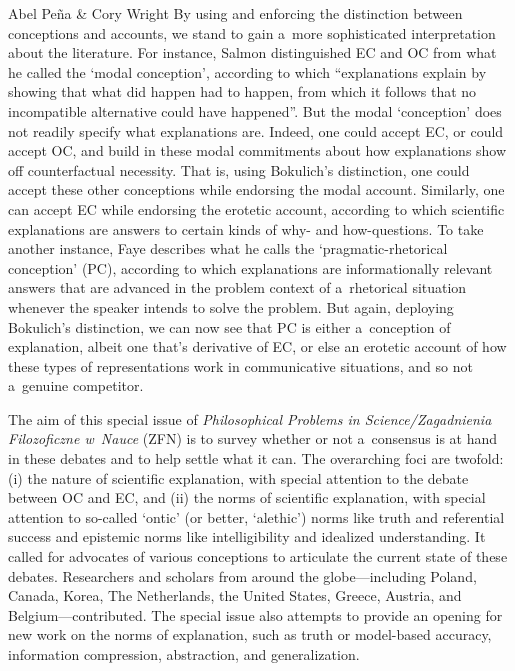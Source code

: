 \begin{editorialeng}{Abel Peña \& Cory Wright}
By using and enforcing the distinction between conceptions and accounts, we stand to gain a~more sophisticated interpretation about the literature. For instance, Salmon
\parencite*[][p.301]{salmon_scientific_1984} %
 distinguished EC and OC from what he called the `modal conception', according to which ``explanations explain by showing that what did happen had to happen, from which it follows that no incompatible alternative could have happened''. But the modal `conception' does not readily specify what explanations are. Indeed, one could accept EC, or could accept OC, and build in these modal commitments about how explanations show off counterfactual necessity. That is, using Bokulich's distinction, one could accept these other conceptions while endorsing the modal account. Similarly, one can accept EC while endorsing the erotetic account, according to which scientific explanations are answers to certain kinds of why- and how-questions. To take another instance, Faye 
\parencites*[][]{faye_explanation_1999}[][]{faye_pragmatic-rhetorical_2007} %
 describes what he calls the `pragmatic-rhetorical conception' (PC), according to which explanations are informationally relevant answers that are advanced in the problem context of a~rhetorical situation whenever the speaker intends to solve the problem. But again, deploying Bokulich's distinction, we can now see that PC is either a~conception of explanation, albeit one that's derivative of EC, or else an erotetic account of how these types of representations work in communicative situations, and so not a~genuine competitor.

The aim of this special issue of \textit{Philosophical Problems in Science/Zagadnienia Filozoficzne w~Nauce} (ZFN) is to survey whether or not a~consensus is at hand in these debates and to help settle what it can. The overarching foci are twofold: (i) the nature of scientific explanation, with special attention to the debate between OC and EC, and (ii) the norms of scientific explanation, with special attention to so-called `ontic' (or better, `alethic') norms like truth and referential success and epistemic norms like intelligibility and idealized understanding. It called for advocates of various conceptions to articulate the current state of these debates. Researchers and scholars from around the globe---including Poland, Canada, Korea, The Netherlands, the United States, Greece, Austria, and Belgium---contributed. The special issue also attempts to provide an opening for new work on the norms of explanation, such as truth or model-based accuracy, information compression, abstraction, and generalization.


\end{editorialeng}
